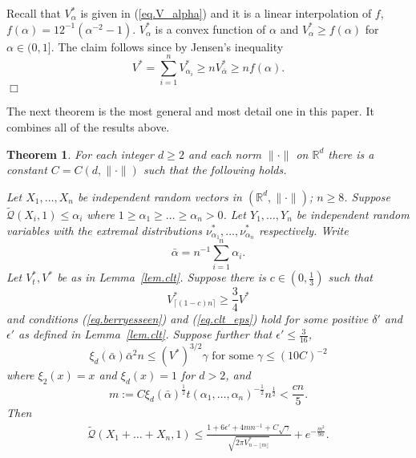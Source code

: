 \documentclass{article}
\newenvironment{proof}{\noindent{\bf Proof}}{\hspace*{\fill}$\Box$}
\newtheorem{theorem}{Theorem}[section]
\newcommand{\concdiam}{\tilde{\mathcal{Q}}}
\begin{document}
\begin{proof} Recall that $V^*_\alpha$ is given in (\ref{eq.V_alpha}) and it is a linear interpolation of $f$, $f(\alpha) = {12}^{-1}(\alpha^{-2}-1)$.
    $V^*_\alpha$ is a convex function of $\alpha$ and $V^*_\alpha \ge f(\alpha)$ for $\alpha \in (0,1]$. The claim follows since by Jensen's inequality
    \[
        V^* = \sum_{i=1}^n V^*_{\alpha_i}  \ge n V^*_{\bar{\alpha}} \ge n f(\alpha).
    \]
\end{proof}

The next theorem is the most general and most detail one in this paper. It combines all of the results above.

\begin{theorem} \label{thm.main}
    For each integer $d \ge 2$ and each norm $\|\cdot\|$ on $\mathbb{R}^d$ there is a constant $C = C(d,\|\cdot\|)$ such that the following holds.

    Let $X_1, \dots, X_n$ be independent random vectors in $(\mathbb{R}^d, \|\cdot\|)$; $n \ge 8$.
    Suppose $\concdiam(X_i, 1) \le \alpha_i$ where $1 \ge \alpha_1 \ge \dots \ge \alpha_n > 0$. 
    Let $Y_1, \dots, Y_n$ be independent random variables with the extremal distributions $\nu^*_{\alpha_1}, \dots, \nu^*_{\alpha_n}$ respectively.
    Write  
    \[
        \bar{\alpha} = {n}^{-1} \sum_{i=1}^{n} \alpha_i.
\]
    Let $V^*_t, V^*$ be as in Lemma~\ref{lem.clt}. Suppose there is $c \in (0, \frac 1 3)$ such that
    \begin{equation}\label{eq.cVstar2}
        V^*_{\lceil(1-c) n\rceil} \ge \frac 3 4 V^*
    \end{equation}
and conditions (\ref{eq.berryesseen}) and (\ref{eq.clt_eps})
    hold for some positive $\delta'$ and $\epsilon'$ as defined in Lemma~\ref{lem.clt}.
    Suppose further that 
$\epsilon' \le \frac 3 {16}$, 
    \begin{equation}\label{eq.condition_near_one}
\xi_d(\bar{\alpha}) \bar{\alpha}^2 n \le (V^*)^{3/2}\gamma \mbox{ for some }\gamma \le  (10 C)^{-2} 
    \end{equation}
    where $\xi_2(x)=x$ and $\xi_d(x)=1$ for $d>2$,
    and    
    \begin{equation}\label{eq.m_eps}
        m:= C \xi_d(\bar{\alpha})^{\frac 1 2} t(\alpha_1, \dots, \alpha_n)^{- \frac 1 2} n^{\frac 1 2} < \frac {c n } 5.
    \end{equation}
    Then
    \begin{align*}\label{eq.main_inequality}
        \concdiam(X_1 + \dots + X_n, 1) \le \frac {1 + 6 \epsilon' + 4 m n^{-1} + C \sqrt{\gamma}} {\sqrt {2 \pi V^*_{n-\lfloor m \rfloor}}} + e^{-\frac{m^2} {9 n}}.
    \end{align*}
\end{theorem}
\end{document}

